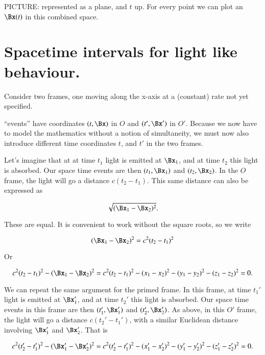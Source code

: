 PICTURE:  represented as a plane, and $t$ up.  For every point we can plot an $\Bx(t)$ in this combined space.

\section{Spacetime intervals for light like behaviour.}

Consider two frames, one moving along the x-axis at a (constant) rate not yet specified.

``events'' have coordinates $(t, \Bx)$ in $O$ and $(t', \Bx')$ in $O'$.  Because we now have to model the mathematics without a notion of simultaneity, we must now also introduce different time coordinates $t$, and $t'$ in the two frames.  

Let's imagine that at at time $t_1$ light is emitted at $\Bx_1$, and at time $t_2$ this light is absorbed.  Our space time events are then $(t_1, \Bx_1)$ and $(t_2, \Bx_2)$.  In the $O$ frame, the light will go a distance $c(t_2 - t_1)$.  This same distance can also be expressed as

\begin{equation}\label{eqn:relativisticElectrodynamicsL2:10}
\sqrt{ (\Bx_1 - \Bx_2)^2}.
\end{equation}

These are equal.  It is convenient to work without the square roots, so we write

\begin{equation}\label{eqn:relativisticElectrodynamicsL2:20}
(\Bx_1 - \Bx_2)^2 = c^2 (t_2 - t_1)^2
\end{equation}

Or

\begin{equation}\label{eqn:relativisticElectrodynamicsL2:30}
c^2 (t_2 - t_1)^2 - (\Bx_1 - \Bx_2)^2 =
c^2 (t_2 - t_1)^2 
- (x_1 - x_2)^2
- (y_1 - y_2)^2
- (z_1 - z_2)^2 = 0.
\end{equation}

We can repeat the same argument for the primed frame.  In this frame, at time $t_1'$ light is emitted at $\Bx_1'$, and at time $t_2'$ this light is absorbed.  Our space time events in this frame are then $(t_1', \Bx_1')$ and $(t_2', \Bx_2')$.  As above, in this $O'$ frame, the light will go a distance $c(t_2' - t_1')$, with a similar Euclidean distance involving $\Bx_1'$ and $\Bx_2'$.  That is

\begin{equation}\label{eqn:relativisticElectrodynamicsL2:40}
c^2 (t_2' - t_1')^2 - (\Bx_1' - \Bx_2')^2 =
c^2 (t_2' - t_1')^2 
- (x_1' - x_2')^2
- (y_1' - y_2')^2
- (z_1' - z_2')^2 = 0.
\end{equation}


